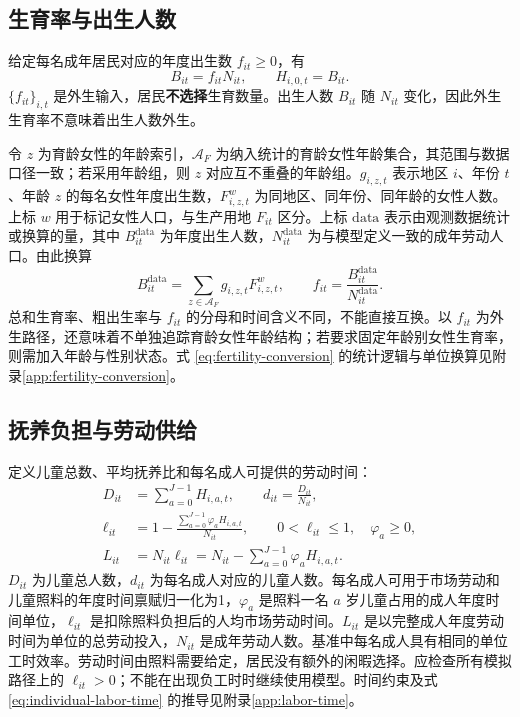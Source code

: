 \documentclass[UTF8,a4paper,zihao=-4,fontset=windows]{ctexart}
\numberwithin{equation}{section}
\begin{document}
\subsection{生育率与出生人数}
给定每名成年居民对应的年度出生数 $f_{it}\geq0$，有
\begin{equation}
  B_{it}=f_{it}N_{it},\qquad H_{i,0,t}=B_{it}.
  \label{eq:births}
\end{equation}
$\{f_{it}\}_{i,t}$ 是外生输入，居民\textbf{不选择}生育数量。出生人数 $B_{it}$ 随 $N_{it}$ 变化，因此外生生育率不意味着出生人数外生。

令 $z$ 为育龄女性的年龄索引，$\mathcal A_F$ 为纳入统计的育龄女性年龄集合，其范围与数据口径一致；若采用年龄组，则 $z$ 对应互不重叠的年龄组。$g_{i,z,t}$ 表示地区 $i$、年份 $t$、年龄 $z$ 的每名女性年度出生数，$F^w_{i,z,t}$ 为同地区、同年份、同年龄的女性人数。上标 $w$ 用于标记女性人口，与生产用地 $F_{it}$ 区分。上标 $\mathrm{data}$ 表示由观测数据统计或换算的量，其中 $B^{\mathrm{data}}_{it}$ 为年度出生人数，$N^{\mathrm{data}}_{it}$ 为与模型定义一致的成年劳动人口。由此换算
\begin{equation}
  B^{\mathrm{data}}_{it}=\sum_{z\in\mathcal A_F}g_{i,z,t}F^w_{i,z,t},
  \qquad
  f_{it}=\frac{B^{\mathrm{data}}_{it}}{N^{\mathrm{data}}_{it}}.
  \label{eq:fertility-conversion}
\end{equation}
总和生育率、粗出生率与 $f_{it}$ 的分母和时间含义不同，不能直接互换。以 $f_{it}$ 为外生路径，还意味着不单独追踪育龄女性年龄结构；若要求固定年龄别女性生育率，则需加入年龄与性别状态。式 \eqref{eq:fertility-conversion} 的统计逻辑与单位换算见附录\ref{app:fertility-conversion}。

\subsection{抚养负担与劳动供给}
定义儿童总数、平均抚养比和每名成人可提供的劳动时间：
\begin{align}
  D_{it}&=\sum_{a=0}^{J-1}H_{i,a,t},\qquad
  d_{it}=\frac{D_{it}}{N_{it}},\label{eq:dependency-ratio}\\
  \ell_{it}&=1-\frac{\sum_{a=0}^{J-1}\varphi_aH_{i,a,t}}{N_{it}},
  \qquad 0<\ell_{it}\leq1,\quad \varphi_a\geq0,
  \label{eq:individual-labor-time}\\
  L_{it}&=N_{it}\ell_{it}
  =N_{it}-\sum_{a=0}^{J-1}\varphi_aH_{i,a,t}.
  \label{eq:labor-supply}
\end{align}
$D_{it}$ 为儿童总人数，$d_{it}$ 为每名成人对应的儿童人数。每名成人可用于市场劳动和儿童照料的年度时间禀赋归一化为1，$\varphi_a$ 是照料一名 $a$ 岁儿童占用的成人年度时间单位，$\ell_{it}$ 是扣除照料负担后的人均市场劳动时间。$L_{it}$ 是以完整成人年度劳动时间为单位的总劳动投入，$N_{it}$ 是成年劳动人数。基准中每名成人具有相同的单位工时效率。劳动时间由照料需要给定，居民没有额外的闲暇选择。应检查所有模拟路径上的 $\ell_{it}>0$；不能在出现负工时时继续使用模型。时间约束及式 \eqref{eq:individual-labor-time} 的推导见附录\ref{app:labor-time}。
\end{document}
